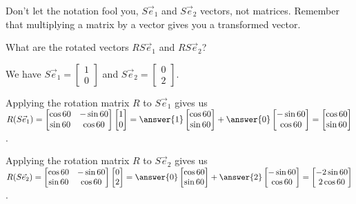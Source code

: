 \documentclass{ximera}
\begin{document}
\begin{exploration}
\begin{example}
    \begin{hint}

        Don't let the notation fool you, $S\vec{e}_1$ and $S\vec{e}_2$ vectors, not matrices. Remember that multiplying a matrix by a vector gives you a transformed vector.

    \end{hint}

    \begin{question}

        What are the rotated vectors $RS\vec{e}_1$ and $RS\vec{e}_2$?

        \begin{solution}

            We have $S\vec{e}_1=\begin{bmatrix} 1 \\ 0 \end{bmatrix}$ and $S\vec{e}_2=\begin{bmatrix} 0 \\ 2 \end{bmatrix}$.

            Applying the rotation matrix $R$ to $S\vec{e}_1$ gives us $R(S\vec{e}_1)=\begin{bmatrix} \cos 60 & -\sin 60 \\ \sin 60 & \cos 60 \end{bmatrix}\begin{bmatrix} 1 \\ 0 \end{bmatrix}=\answer{1}\begin{bmatrix} \cos 60 \\ \sin 60 \end{bmatrix}+\answer{0}
            \begin{bmatrix} -\sin 60 \\ \cos 60 \end{bmatrix}=\begin{bmatrix} \cos 60 \\ \sin 60 \end{bmatrix}$.

            Applying the rotation matrix $R$ to $S\vec{e}_2$ gives us $R(S\vec{e}_2)=\begin{bmatrix} \cos 60 & -\sin 60 \\ \sin 60 & \cos 60 \end{bmatrix}\begin{bmatrix} 0 \\ 2 \end{bmatrix}=\answer{0}\begin{bmatrix} \cos 60 \\ \sin 60 \end{bmatrix}+\answer{2}
            \begin{bmatrix} -\sin 60 \\ \cos 60 \end{bmatrix}=\begin{bmatrix} -2\sin 60 \\ 2\cos 60 \end{bmatrix}$.


\end{solution}
\end{question}
\end{example}
\end{exploration}
\end{document}
